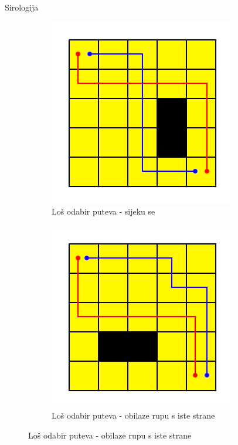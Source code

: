 \begin{statement}[
  problempoints=100,
  timelimit=1 sekunda,
  memorylimit=1024 MiB,
]{Sirologija}
\begin{figure}[!h]
    \centering
    \begin{subfigure}{0.49\linewidth}
      \centering
      \includegraphics[width=\linewidth]{pic/sijeku_se.png}
      \caption{Loš odabir puteva - sijeku se}

    \end{subfigure}
    \begin{subfigure}{0.49\linewidth}
      \centering
      \includegraphics[width=\linewidth]{pic/ista_strana.png}
      \caption{Loš odabir puteva - obilaze rupu s iste strane}


\end{subfigure}
\end{figure}
\end{statement}
